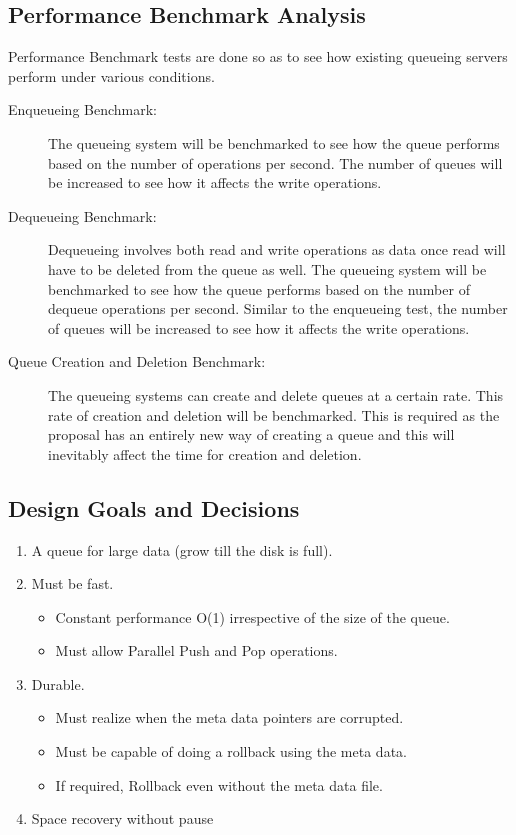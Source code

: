 \documentclass[12pt,a4paper]{article}
\begin{document}
 \subsection{Performance Benchmark Analysis}
 
 Performance Benchmark tests are done so as to see how existing queueing servers perform under various conditions.
 
  \begin{description}
  	\item [Enqueueing Benchmark:] 
  	The queueing system will be benchmarked to see how the queue performs based on the number of operations per second. The number of queues will be increased to see how it affects the write operations.
  	
  	\item [Dequeueing Benchmark:]
  	Dequeueing involves both read and write operations as data once read will have to be deleted from the queue as well. The queueing system will be benchmarked to see how the queue performs based on the number of dequeue operations per second. Similar to the enqueueing test, the number of queues will be increased to see how it affects the write operations.
  	
  	\item [Queue Creation and Deletion Benchmark:]
  	The queueing systems can create and delete queues at a certain rate. This rate of creation and deletion will be benchmarked. This is required as the proposal has an entirely new way of creating a queue and this will inevitably affect the time for creation and deletion. 
  	
  \end{description}
 
 
  \subsection{Design Goals and Decisions}
  
   
  \begin{enumerate}
  	\item A queue for large data (grow till the disk is full).
  	\item Must be fast.
	  	\begin{itemize}
	  		\item Constant performance O(1) irrespective of the size of the queue.
	  		\item Must allow Parallel Push and Pop operations. 
	  	\end{itemize}
  	\item Durable.
  	  	\begin{itemize}
  	  		\item Must realize when the meta data pointers are corrupted.
  	  		\item Must be capable of doing a rollback using the meta data. 
  	  		\item If required, Rollback even without the meta data file.
  	  	\end{itemize}
  	  \item Space recovery without pause
  \end{enumerate}
  
\end{document}
